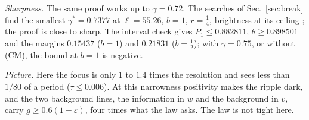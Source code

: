 \emph{Sharpness.}
The same proof works up to $\gamma=0.72$.
The searches of Sec.~\ref{sec:break} find the smallest $\gamma^*=0.7377$ at $\ell=55.26$, $b=1$, $r=\tfrac14$, brightness at its ceiling \numst; the proof is close to sharp.
The interval check gives $P_1\le0.882811$, $\theta\ge0.898501$ and the margins $0.15437$ ($b=1$) and $0.21831$ ($b=\tfrac12$); with $\gamma=0.75$, or without (CM), the bound at $b=1$ is negative.

\emph{Picture.}
Here the focus is only $1$ to $1.4$ times the resolution and sees less than $1/80$ of a period ($\tau\le0.006$).
At this narrowness positivity makes the ripple dark, and the two background lines, the information in $w$ and the background in $v$, carry $g\ge0.6(1-\bar\varepsilon)$, four times what the law asks.
The law is not tight here.
